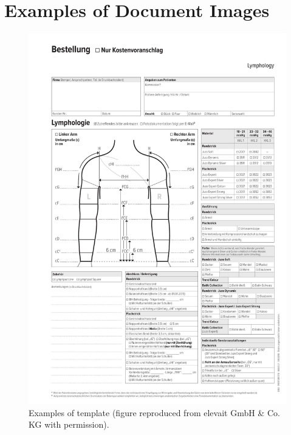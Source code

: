 \section{Examples of Document Images}
\vspace*{0.5cm}
\begin{figure}[H]
        \begin{center}
	    \includegraphics[scale=0.29]{images/Appendix/template.png}
	    \caption[Example of template.]{Examples of template (figure reproduced from elevait GmbH \& Co. KG with permission).}
	    \label{fig:template}
	    \end{center}
\end{figure}

